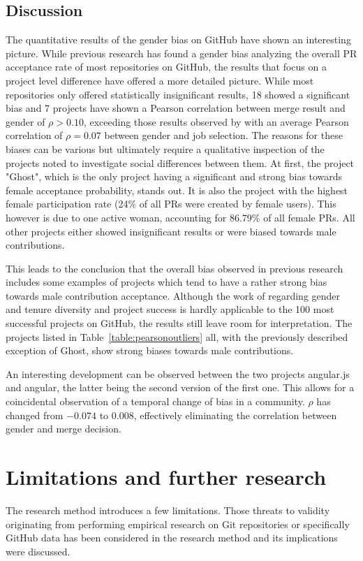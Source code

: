 \subsection{Discussion}

The quantitative results of the gender bias on GitHub have shown an interesting picture. While previous research has found a gender bias analyzing the overall \ac{PR} acceptance rate of most repositories on GitHub, the results that focus on a project level difference have offered a more detailed picture. While most repositories only offered statistically insignificant results, 18 showed a significant bias and 7 projects have shown a Pearson correlation between merge result and gender of $\rho > 0.10$, exceeding those results observed by \citeauthor{Davison2000225} with an average Pearson correlation of $\rho = 0.07$ between gender and job selection. The reasons for these biases can be various but ultimately require a qualitative inspection of the projects noted to investigate social differences between them. At first, the project "Ghost", which is the only project having a significant and strong bias towards female acceptance probability, stands out. It is also the project with the highest female participation rate (24\% of all \ac{PR}s were created by female users). This however is due to one active woman, accounting for 86.79\% of all female \ac{PR}s. All other projects either showed insignificant results or were biased towards male contributions.

This leads to the conclusion that the overall bias observed in previous research includes some examples of projects which tend to have a rather strong bias towards male contribution acceptance. Although the work of \citeauthor{Vasilescu:2015:GTD:2702123.2702549} regarding gender and tenure diversity and project success is hardly applicable to the 100 most successful projects on GitHub, the results still leave room for interpretation. The projects listed in Table~\ref{table:pearsonoutliers} all, with the previously described exception of Ghost, show strong biases towards male contributions.

An interesting development can be observed between the two projects angular.js and angular, the latter being the second version of the first one. This allows for a coincidental observation of a temporal change of bias in a community. $ \rho $ has changed from $ -0.074 $ to $0.008$, effectively eliminating the correlation between gender and merge decision.

\section{Limitations and further research}
The research method introduces a few limitations. Those threats to validity originating from performing empirical research on Git repositories \cite{perils-ms-research:2009} or specifically GitHub data \cite{perils-github:2015} has been considered in the research method and its implications were discussed.

